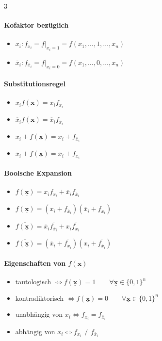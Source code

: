 \documentclass[6pt,a4paper]{scrartcl}
\renewcommand{\vec}[1]{\ensuremath{\underline{\boldsymbol {#1}}}}
\renewcommand{\vec}[1]{\ensuremath{\underline{\boldsymbol {#1}}}}
\begin{document}
\begin{multicols*}{3}
	\paragraph{Kofaktor bezüglich}
	\begin{itemize}\itemsep0pt
		\item $x_i: f_{x_i}=f|_{x_i=1}=f(x_1,\dots,1,\dots,x_n)$
		\item $\overline x_i: f_{\overline x_i}=f|_{x_i=0}=f(x_1,\dots,0,\dots,x_n)$
	\end{itemize}
	\paragraph{Substitutionsregel}
	\begin{itemize}\itemsep0pt
		\item $x_i f(\vec{x})=x_i f_{x_{i}}$
		\item $\overline{x}_i f(\vec{x})=\overline{x}_i f_{\overline{x}_{i}}$
		\item $x_i + f(\vec{x})=x_i + f_{\overline{x}_{i}}$
		\item $\overline{x}_i + f(\vec{x})=\overline{x}_i + f_{x_{i}}$
	\end{itemize}
	\paragraph{Boolsche Expansion}
	\begin{itemize}\itemsep0pt
		\item $f(\vec{x})=x_i f_{x_i} + \overline{x}_i f_{\overline{x}_i}$
		\item $f(\vec{x})=(x_i + f_{\overline{x}_i}) (\overline{x}_i + f_{x_i})$
		\item $\overline{f(\vec{x})}=\overline{x}_i \overline{f_{\overline{x}_i}} + x_i \overline{f_{x_i}}$
		\item $\overline{f(\vec{x})}=(\overline{x}_i + \overline{f_{x_i}}) (x_i + \overline{f_{\overline{x}_i}})$
	\end{itemize}
	\paragraph{Eigenschaften von $f(\vec{x})$}
	\begin{itemize}\itemsep0pt
		\item tautologisch $\Leftrightarrow f(\vec{x})=1 \qquad \forall \vec x \in \{0,1\}^n$
		\item kontradiktorisch $\Leftrightarrow f(\vec{x})=0 \qquad \forall \vec x \in \{0,1\}^n$
		\item unabhängig von $x_i \Leftrightarrow f_{x_i} = f_{\overline x_i}$
		\item abhängig von $x_i \Leftrightarrow f_{x_i} \ne f_{\overline x_i}$
	\end{itemize}


\end{multicols*}
\end{document}
